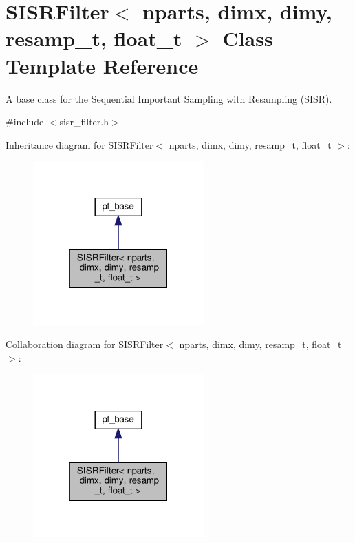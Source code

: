 \hypertarget{classSISRFilter}{}\section{S\+I\+S\+R\+Filter$<$ nparts, dimx, dimy, resamp\+\_\+t, float\+\_\+t $>$ Class Template Reference}
\label{classSISRFilter}


A base class for the Sequential Important Sampling with Resampling (S\+I\+SR).  




{\ttfamily \#include $<$sisr\+\_\+filter.\+h$>$}



Inheritance diagram for S\+I\+S\+R\+Filter$<$ nparts, dimx, dimy, resamp\+\_\+t, float\+\_\+t $>$\+:
\nopagebreak
\begin{figure}[H]
\begin{center}
\leavevmode
\includegraphics[width=186pt]{classSISRFilter__inherit__graph}
\end{center}
\end{figure}


Collaboration diagram for S\+I\+S\+R\+Filter$<$ nparts, dimx, dimy, resamp\+\_\+t, float\+\_\+t $>$\+:
\nopagebreak
\begin{figure}[H]
\begin{center}
\leavevmode
\includegraphics[width=186pt]{classSISRFilter__coll__graph}
\end{center}
\end{figure}
